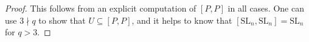 \begin{proof}
    This follows from an explicit computation of $[P,P]$ in all cases. One can use $3\nmid q$ to show that $U\subseteq[P,P]$, and it helps to know that $[\mathrm{SL}_n,\mathrm{SL}_n]=\mathrm{SL}_n$ for $q>3$.

\end{proof}
